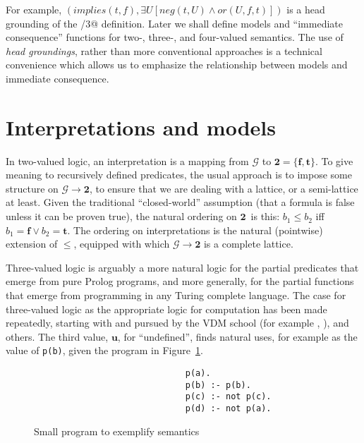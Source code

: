 \documentclass{tlp}
\newcommand{\Bi}{\ensuremath{\mathbf{2}}}
\newcommand{\fun}{\rightarrow}
\newcommand{\Her}{\mathcal{G}}
\begin{document}
For example, $(implies(t, f), \exists U [ neg(t, U) \land or(U, f, t)])$
is a head grounding of the \verb@implies/3@ definition.
Later we shall define models and  ``immediate consequence'' 
functions for two-, three-, and four-valued semantics.
The use of \emph{head groundings}, rather than more conventional 
approaches is a technical convenience which allows us to emphasize 
the relationship between models and immediate consequence.

\section{Interpretations and models}
\label{sec-interpretations}

In two-valued logic, an interpretation is a mapping from $\Her$
to $\Bi = \{\mathbf{f},\mathbf{t}\}$.
To give meaning to recursively defined predicates, the usual approach is
to impose some structure on $\Her \fun \Bi$, to ensure that we
are dealing with a lattice, or a semi-lattice at least.
Given the traditional ``closed-world'' assumption (that a formula is
false unless it can be proven true), the natural ordering on \Bi\ is this:
$b_1 \leq b_2$ iff $b_1 = \mathbf{f} \lor b_2 = \mathbf{t}$.
The ordering on interpretations is the natural (pointwise)
extension of $\leq$,
equipped with which $\Her \fun \Bi$ is a complete lattice.

Three-valued logic is arguably a more natural logic for the partial
predicates that emerge from pure Prolog programs, and more
generally, for the partial functions that emerge from programming
in any Turing complete language.
The case for three-valued logic as the appropriate logic for
computation has been made repeatedly, starting
with  and pursued by the VDM school
(for example
, ),
and others.
The third value, $\mathbf{u}$, for ``undefined'', finds natural uses,
for example as the value of \verb!p(b)!, given the program in
Figure~\ref{eg-clark}.
\begin{figure}
\begin{verbatim}
                              p(a).
                              p(b) :- p(b).
                              p(c) :- not p(c).
                              p(d) :- not p(a).
\end{verbatim}
\caption{Small program to exemplify semantics}
\label{eg-clark}
\end{figure}
\end{document}
